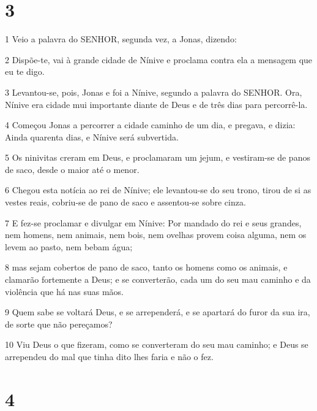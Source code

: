\chapter{3}

\par 1 Veio a palavra do SENHOR, segunda vez, a Jonas, dizendo:
\par 2 Dispõe-te, vai à grande cidade de Nínive e proclama contra ela a mensagem que eu te digo.
\par 3 Levantou-se, pois, Jonas e foi a Nínive, segundo a palavra do SENHOR. Ora, Nínive era cidade mui importante diante de Deus e de três dias para percorrê-la.
\par 4 Começou Jonas a percorrer a cidade caminho de um dia, e pregava, e dizia: Ainda quarenta dias, e Nínive será subvertida.
\par 5 Os ninivitas creram em Deus, e proclamaram um jejum, e vestiram-se de panos de saco, desde o maior até o menor.
\par 6 Chegou esta notícia ao rei de Nínive; ele levantou-se do seu trono, tirou de si as vestes reais, cobriu-se de pano de saco e assentou-se sobre cinza.
\par 7 E fez-se proclamar e divulgar em Nínive: Por mandado do rei e seus grandes, nem homens, nem animais, nem bois, nem ovelhas provem coisa alguma, nem os levem ao pasto, nem bebam água;
\par 8 mas sejam cobertos de pano de saco, tanto os homens como os animais, e clamarão fortemente a Deus; e se converterão, cada um do seu mau caminho e da violência que há nas suas mãos.
\par 9 Quem sabe se voltará Deus, e se arrependerá, e se apartará do furor da sua ira, de sorte que não pereçamos?
\par 10 Viu Deus o que fizeram, como se converteram do seu mau caminho; e Deus se arrependeu do mal que tinha dito lhes faria e não o fez.

\chapter{4}

